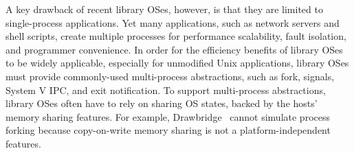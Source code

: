 A key drawback of recent library OSes, however,
is that they are limited to single-process applications.
Yet many applications, such as network servers and
shell scripts,
create multiple processes
for
performance scalability, fault isolation, and programmer convenience.
In order for the efficiency benefits of library OSes to be widely applicable,
especially for unmodified Unix applications,
library OSes must  provide commonly-used multi-process abstractions,
such as fork,  signals, System V IPC, and exit notification.
To support multi-process abstractions, library OSes often have to rely on sharing OS states,
backed by the hosts' memory sharing features.
For example, Drawbridge~\citep{porter11drawbridge} cannot simulate process forking because copy-on-write memory sharing is not a platform-independent features.



